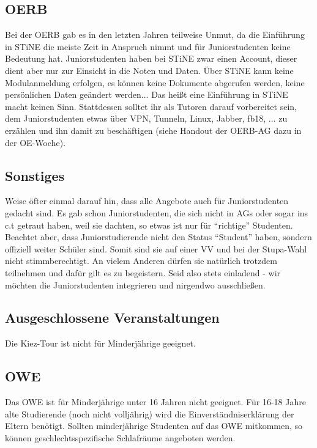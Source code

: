 \documentclass[a4paper,11pt]{scrartcl} %
\begin{document}
	\subsection{OERB}

Bei der OERB gab es in den letzten Jahren teilweise Unmut, da die Einführung in STiNE die meiste Zeit in Anspruch nimmt und für Juniorstudenten keine Bedeutung hat. Juniorstudenten haben bei STiNE zwar einen Account, dieser dient aber nur zur Einsicht in die Noten und Daten. Über STiNE kann keine Modulanmeldung erfolgen, es können keine Dokumente abgerufen werden, keine persönlichen Daten geändert werden... Das heißt eine Einführung in STiNE macht keinen Sinn. Stattdessen solltet ihr als Tutoren darauf vorbereitet sein, dem Juniorstudenten etwas über VPN, Tunneln, Linux, Jabber, fb18, ... zu erzählen und ihn damit zu beschäftigen (siehe Handout der OERB-AG dazu in der OE-Woche).

\subsection{Sonstiges} %

Weise öfter einmal darauf hin, dass alle Angebote auch für Juniorstudenten gedacht sind. Es gab schon Juniorstudenten, die sich nicht in AGs oder sogar ins c.t getraut haben, weil sie dachten, so etwas ist nur für "`richtige"' Studenten. Beachtet aber, dass Juniorstudierende nicht den Status "`Student"' haben, sondern offiziell weiter Schüler sind. Somit sind sie auf einer VV und bei der Stupa-Wahl nicht stimmberechtigt. An vielem Anderen dürfen sie natürlich trotzdem teilnehmen und dafür gilt es zu begeistern. Seid also stets einladend - wir möchten die Juniorstudenten integrieren und nirgendwo ausschließen.

	\subsection{Ausgeschlossene Veranstaltungen}
	
Die Kiez-Tour ist nicht für Minderjährige geeignet.

	\subsection{OWE}
	
Das OWE ist für Minderjährige unter 16 Jahren nicht geeignet. Für 16-18 Jahre alte Studierende (noch nicht volljährig) wird die Einverständniserklärung der Eltern benötigt. Sollten minderjährige Studenten auf das OWE mitkommen, so können geschlechtsspezifische Schlafräume angeboten werden.
\end{document}
